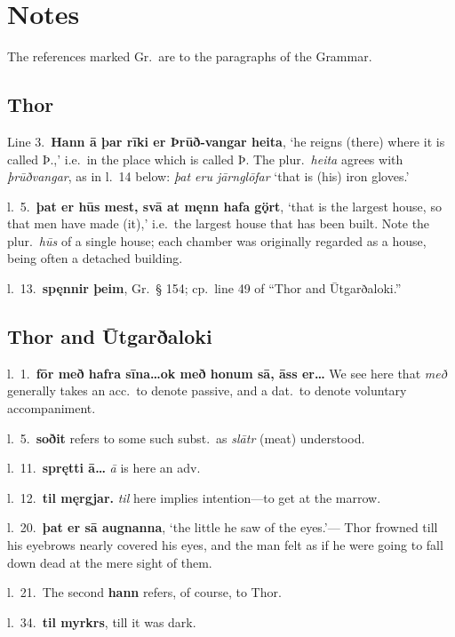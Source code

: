 \documentclass[12pt,letterpaper]{book}
\newcommand\emptypage{\clearpage{\pagestyle{empty}\cleardoublepage}}
\begin{document}
\emptypage

\chapter{Notes}

The references marked Gr.\ are to the paragraphs of the Grammar.


\section{Thor}

Line 3.\ \textbf{Hann ā þar rīki er Þrūð-vangar heita}, `he reigns
(there) where it is called Þ.,' i.e.\ in the place which is called
Þ\@.  The plur.\ \textit{heita} agrees with \textit{þrūðvangar}, as in l.\ 14
below: \textit{þat eru jārnglōfar} `that is (his) iron gloves.'

l.\ 5.\ \textbf{þat er hūs mest, svā at męnn hafa gǫ̈rt}, `that is the
largest house, so that men have made (it),' i.e.\ the largest
house that has been built.  Note the plur.\ \textit{hūs} of a single
house; each chamber was originally regarded as a house, being
often a detached building.

l.\ 13.\ \textbf{spęnnir þeim}, Gr.\ § 154; cp.\ line 49 of
``Thor and Ūtgarðaloki.''

\section{Thor and Ūtgarðaloki}

l.\ 1.\ \textbf{fōr með hafra sīna\ldots ok með honum sā, āss er\ldots}  We
see here that \textit{með} generally takes an acc.\ to denote passive,
and a dat.\ to denote voluntary accompaniment.

l.\ 5.\ \textbf{soðit} refers to some such subst.\ as \textit{slātr} (meat)
understood.

l.\ 11.\ \textbf{sprętti ā\ldots} \textit{ā} is here an adv.

l.\ 12.\ \textbf{til męrgjar.}  \textit{til} here implies intention---to get at
the marrow.

l.\ 20.\ \textbf{þat er sā augnanna}, `the little he saw of the eyes.'---
Thor frowned till his eyebrows nearly covered his eyes, and the
man felt as if he were going to fall down dead at the mere sight
of them.

l.\ 21.\ The second \textbf{hann} refers, of course, to Thor.

l.\ 34.\ \textbf{til myrkrs}, till it was dark.
\end{document}
